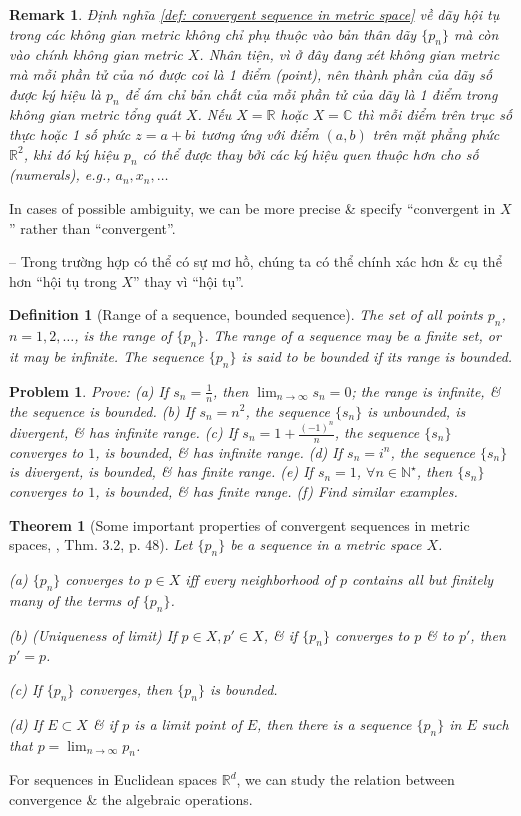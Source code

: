 \documentclass{article}
\newtheorem{definition}{Definition}
\newtheorem{problem}{Problem}
\newtheorem{remark}{Remark}
\newtheorem{theorem}{Theorem}
\begin{document}
\begin{remark}
	Định nghĩa \ref{def: convergent sequence in metric space} về dãy hội tụ trong các không gian metric không chỉ phụ thuộc vào bản thân dãy $\{p_n\}$ mà còn vào chính không gian metric $X$. Nhân tiện, vì ở đây đang xét không gian metric mà mỗi phần tử của nó được coi là 1 điểm (point), nên thành phần của dãy số được ký hiệu là $p_n$ để ám chỉ bản chất của mỗi phần tử của dãy là 1 điểm trong không gian metric tổng quát $X$. Nếu $X = \mathbb{R}$ hoặc $X = \mathbb{C}$ thì mỗi điểm trên trục số thực hoặc 1 số phức $z = a + bi$ tương ứng với điểm $(a,b)$ trên mặt phẳng phức $\mathbb{R}^2$, khi đó ký hiệu $p_n$ có thể được thay bởi các ký hiệu quen thuộc hơn cho số (numerals), e.g., $a_n,x_n,\ldots$
\end{remark}
In cases of possible ambiguity, we can be more precise \& specify ``convergent in $X$'' rather than ``convergent''.

-- Trong trường hợp có thể có sự mơ hồ, chúng ta có thể chính xác hơn \& cụ thể hơn ``hội tụ trong $X$'' thay vì ``hội tụ''.

\begin{definition}[Range of a sequence, bounded sequence]
	The set of all points $p_n$, $n = 1,2,\ldots$, is the {\rm range} of $\{p_n\}$. The range of a sequence may be a finite set, or it may be infinite. The sequence $\{p_n\}$ is said to be {\rm bounded} if its range is bounded.
\end{definition}

\begin{problem}
	Prove: (a) If $s_n = \frac{1}{n}$, then $\lim_{n\to\infty} s_n = 0$; the range is infinite, \& the sequence is bounded. (b) If $s_n = n^2$, the sequence $\{s_n\}$ is unbounded, is divergent, \& has infinite range. (c) If $s_n = 1 + \frac{(-1)^n}{n}$, the sequence $\{s_n\}$ converges to $1$, is bounded, \& has infinite range. (d) If $s_n = i^n$, the sequence $\{s_n\}$ is divergent, is bounded, \& has finite range. (e) If $s_n = 1$, $\forall n\in\mathbb{N}^\star$, then $\{s_n\}$ converges to $1$, is bounded, \& has finite range. (f) Find similar examples.
\end{problem}

\begin{theorem}[Some important properties of convergent sequences in metric spaces, \cite{Rudin1976}, Thm. 3.2, p. 48]
	Let $\{p_n\}$ be a sequence in a metric space $X$.
	\item(a) $\{p_n\}$ converges to $p\in X$ iff every neighborhood of $p$ contains all but finitely many of the terms of $\{p_n\}$.
	\item(b) {\rm(Uniqueness of limit)} If $p\in X,p'\in X$, \& if $\{p_n\}$ converges to $p$ \& to $p'$, then $p' = p$.
	\item(c) If $\{p_n\}$ converges, then $\{p_n\}$ is bounded.
	\item(d) If $E\subset X$ \& if $p$ is a limit point of $E$, then there is a sequence $\{p_n\}$ in $E$ such that $p = \lim_{n\to\infty} p_n$.
\end{theorem}
For sequences in Euclidean spaces $\mathbb{R}^d$, we can study the relation between convergence \& the algebraic operations.
\end{document}
